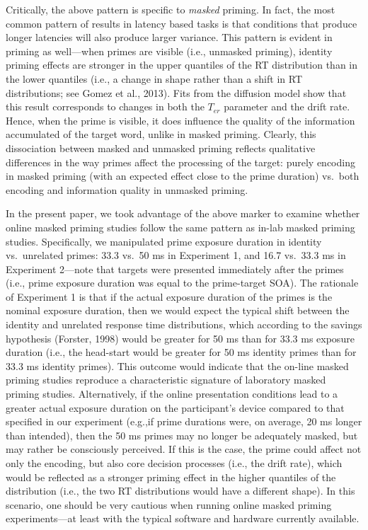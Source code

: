 \documentclass[
  english,
  man,floatsintext]{apa6}
\begin{document}
Critically, the above pattern is specific to \emph{masked} priming. In fact, the most common pattern of results in latency based tasks is that conditions that produce longer latencies will also produce larger variance. This pattern is evident in priming as well---when primes are visible (i.e., unmasked priming), identity priming effects are stronger in the upper quantiles of the RT distribution than in the lower quantiles (i.e., a change in shape rather than a shift in RT distributions; see Gomez et al., 2013). Fits from the diffusion model show that this result corresponds to changes in both the \(T_{er}\) parameter and the drift rate. Hence, when the prime is visible, it does influence the quality of the information accumulated of the target word, unlike in masked priming. Clearly, this dissociation between masked and unmasked priming reflects qualitative differences in the way primes affect the processing of the target: purely encoding in masked priming (with an expected effect close to the prime duration) vs.~both encoding and information quality in unmasked priming.

In the present paper, we took advantage of the above marker to examine whether online masked priming studies follow the same pattern as in-lab masked priming studies. Specifically, we manipulated prime exposure duration in identity vs.~unrelated primes: 33.3 vs.~50 ms in Experiment 1, and 16.7 vs.~33.3 ms in Experiment 2---note that targets were presented immediately after the primes (i.e., prime exposure duration was equal to the prime-target SOA). The rationale of Experiment 1 is that if the actual exposure duration of the primes is the nominal exposure duration, then we would expect the typical shift between the identity and unrelated response time distributions, which according to the savings hypothesis (Forster, 1998) would be greater for 50 ms than for 33.3 ms exposure duration (i.e., the head-start would be greater for 50 ms identity primes than for 33.3 ms identity primes). This outcome would indicate that the on-line masked priming studies reproduce a characteristic signature of laboratory masked priming studies. Alternatively, if the online presentation conditions lead to a greater actual exposure duration on the participant's device compared to that specified in our experiment (e.g.,if prime durations were, on average, 20 ms longer than intended), then the 50 ms primes may no longer be adequately masked, but may rather be consciously perceived. If this is the case, the prime could affect not only the encoding, but also core decision processes (i.e., the drift rate), which would be reflected as a stronger priming effect in the higher quantiles of the distribution (i.e., the two RT distributions would have a different shape). In this scenario, one should be very cautious when running online masked priming experiments---at least with the typical software and hardware currently available.
\end{document}
